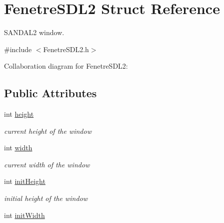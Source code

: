 \hypertarget{structFenetreSDL2}{}\section{Fenetre\+S\+D\+L2 Struct Reference}
\label{structFenetreSDL2}


S\+A\+N\+D\+A\+L2 window.  




{\ttfamily \#include $<$Fenetre\+S\+D\+L2.\+h$>$}



Collaboration diagram for Fenetre\+S\+D\+L2\+:
\subsection*{Public Attributes}
\begin{DoxyCompactItemize}
\item 
int \hyperlink{structFenetreSDL2_aeaecc1454f5f4d31067de45e61c05f01}{height}\hypertarget{structFenetreSDL2_aeaecc1454f5f4d31067de45e61c05f01}{}\label{structFenetreSDL2_aeaecc1454f5f4d31067de45e61c05f01}

\begin{DoxyCompactList}\small\item\em current height of the window \end{DoxyCompactList}\item 
int \hyperlink{structFenetreSDL2_ac45087e9400a3ca28331db9ee7dc713f}{width}\hypertarget{structFenetreSDL2_ac45087e9400a3ca28331db9ee7dc713f}{}\label{structFenetreSDL2_ac45087e9400a3ca28331db9ee7dc713f}

\begin{DoxyCompactList}\small\item\em current width of the window \end{DoxyCompactList}\item 
int \hyperlink{structFenetreSDL2_ab5d178203cbb174048be3eea45b297a5}{init\+Height}\hypertarget{structFenetreSDL2_ab5d178203cbb174048be3eea45b297a5}{}\label{structFenetreSDL2_ab5d178203cbb174048be3eea45b297a5}

\begin{DoxyCompactList}\small\item\em initial height of the window \end{DoxyCompactList}\item 
int \hyperlink{structFenetreSDL2_a6b8858b4611f794e5f95e880e47d9b5d}{init\+Width}\hypertarget{structFenetreSDL2_a6b8858b4611f794e5f95e880e47d9b5d}{}\label{structFenetreSDL2_a6b8858b4611f794e5f95e880e47d9b5d}


\end{DoxyCompactItemize}
